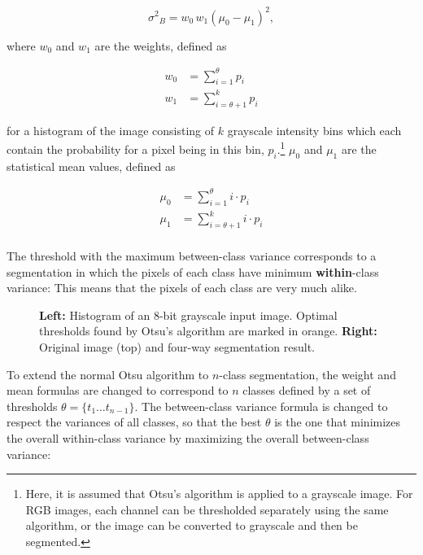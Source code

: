\[ {\sigma^2}_{B} = w_0 \, w_1 (\mu_0 - \mu_1)^2,\]

\noindent where $w_0$ and $w_1$ are the weights, defined as

\begin {align}
	w_0 &= \sum \limits_{i=1}^{\theta} p_i \\
	w_1 &= \sum \limits_{i=\theta+1}^{k} p_i
\end {align}

\noindent for a histogram of the image consisting of $k$ grayscale intensity bins which each contain the probability for a pixel being in this bin, $p_i$.\footnote{Here, it is assumed that Otsu's algorithm is applied to a grayscale image. For RGB images, each channel can be thresholded separately using the same algorithm, or the image can be converted to grayscale and then be segmented.} $\mu_0$ and $\mu_1$ are the statistical mean values, defined as

\begin {align}
	\mu_0 &= \sum \limits_{i=1}^{\theta} i \cdot p_i \\
	\mu_1 &= \sum \limits_{i=\theta + 1}^{k} i \cdot p_i\\
\end {align}

\noindent The threshold with the maximum between-class variance corresponds to a segmentation in which the pixels of each class have minimum \textbf{within}-class variance: This means that the pixels of each class are very much alike.

\begin {figure}[!ht]
	\begin {subfigure}[t]{0.3\linewidth}
	\end {subfigure}
	\hspace{5.5cm}
	\begin {subfigure}[b]{0.3\linewidth}
	\end {subfigure}
		\caption[]{\textbf{Left:} Histogram of an 8-bit grayscale input image. Optimal thresholds found by Otsu's algorithm are marked in orange. \textbf{Right:} Original image (top) and four-way segmentation result.}
		\label{fig:otsu}
	\end {figure}

\noindent To extend the normal Otsu algorithm to $n$-class segmentation, the weight and mean formulas are changed to correspond to $n$ classes defined by a set of thresholds $\theta = \{t_1 \dots t_{n-1}\}$. The between-class variance formula is changed to respect the variances of all classes, so that the best $\theta$ is the one that minimizes the overall within-class variance by maximizing the overall between-class variance:

